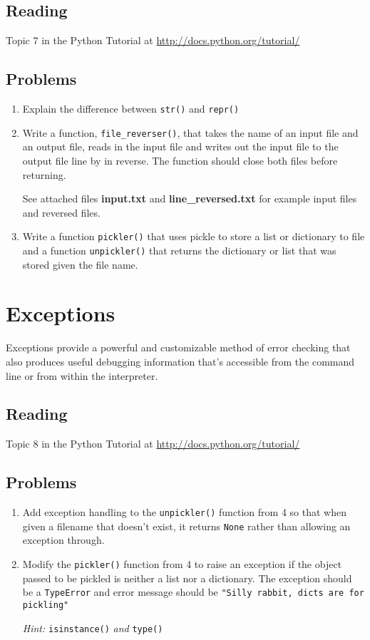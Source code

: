 \subsection{Reading}
Topic 7 in the Python Tutorial at \url{http://docs.python.org/tutorial/} \cite{website:Python272docs}

\subsection{Problems}
\begin{enumerate}
	\item Explain the difference between \verb|str()| and \verb|repr()|
	\item Write a function, \verb|file_reverser()|, that takes the name of an input file and an output file, reads in the input file and writes out the input file to the output file line by in reverse. The function should close both files before returning.

See attached files \textbf{input.txt} and \textbf{line\_reversed.txt} for example input files and reversed files.
	\item Write a function \verb|pickler()| that uses pickle to store a list or dictionary to file and a function \verb|unpickler()| that returns the dictionary or list that was stored given the file name.
\end{enumerate}

\section{Exceptions}
 Exceptions provide a powerful and customizable method of error checking that also produces useful debugging information that's accessible from the command line or from within the interpreter.

\subsection{Reading}
Topic 8 in the Python Tutorial at \url{http://docs.python.org/tutorial/} \cite{website:Python272docs}

\subsection{Problems}

\begin{enumerate}

	\item Add exception handling to the \verb|unpickler()| function from 4 so that when given a filename that doesn't exist, it returns \verb|None| rather than allowing an exception through.
	\item Modify the \verb|pickler()| function from 4 to raise an exception if the object passed to be pickled is neither a list nor a dictionary. The exception should be a \verb|TypeError| and error message should be \verb|"Silly rabbit, dicts are for pickling"|

\emph{Hint: }\verb|isinstance()| \emph{and} \verb|type()|
\end{enumerate}

